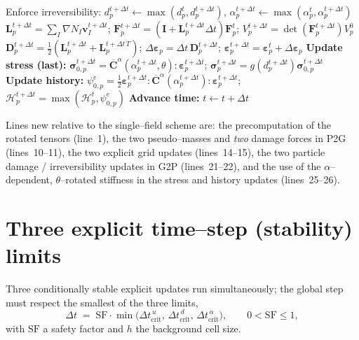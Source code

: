 \documentclass[12pt,a4paper]{article}
\newcommand{\bF}{\mathbf{F}}
\newcommand{\bI}{\mathbf{I}}
\newcommand{\bsig}{\boldsymbol{\sigma}}
\newcommand{\beps}{\boldsymbol{\varepsilon}}
\newcommand{\bv}{\mathbf{v}}
\newcommand{\bL}{\mathbf{L}}
\newcommand{\bD}{\mathbf{D}}
\newcommand{\Ca}{\overline{\mathbf{C}}^{\alpha}}     %
\newcommand{\Dt}{\Delta t}
\begin{document}
\begin{algorithm}[H]
\begin{algorithmic}[1]
					\State Enforce irreversibility: $d_p^{t+\Dt}\!\leftarrow\!\max(d_p^t,d_p^{t+\Dt})$,\;\; $\alpha_p^{t+\Dt}\!\leftarrow\!\max(\alpha_p^t,\alpha_p^{t+\Dt})$
					\State $\bL_p^{t+\Dt}=\sum_I\nabla N_I\bv_I^{t+\Dt}$;\;\;
					$\bF_p^{t+\Dt}=(\bI+\bL_p^{t+\Dt}\Dt)\bF_p^{t}$;\;\; $V_p^{t+\Dt}=\det(\bF_p^{t+\Dt})V_p^0$
					\State $\bD_p^{t+\Dt}=\tfrac12(\bL_p^{t+\Dt}+\bL_p^{t+\Dt\,T})$;\;\; $\Delta\beps_p=\Dt\,\bD_p^{t+\Dt}$;\;\; $\beps_p^{t+\Dt}=\beps_p^{t}+\Delta\beps_p$
					\State \textbf{Update stress (last):} $\bsig_{0,p}^{t+\Dt}=\Ca(\alpha_p^{t+\Dt},\theta)\!:\!\beps_p^{t+\Dt}$;\;\; $\bsig_p^{t+\Dt}=g(d_p^{t+\Dt})\bsig_{0,p}^{t+\Dt}$
					\State \textbf{Update history:} $\psi^e_{0,p}=\tfrac12\beps_p^{t+\Dt}\!:\!\Ca(\alpha_p^{t+\Dt})\!:\!\beps_p^{t+\Dt}$;\;\; $\mathcal{H}_p^{t+\Dt}=\max(\mathcal{H}_p^t,\psi^e_{0,p})$
				\EndPhase
				\State \textbf{Advance time:} $t\leftarrow t+\Dt$
			\EndWhile
		\end{algorithmic}
	\end{algorithm}

	Lines new relative to the single--field scheme are: the precomputation of the
	rotated tensors (line~1), the two pseudo--masses and \emph{two} damage forces in
	P2G (lines~10--11), the two explicit grid updates (lines~14--15), the two
	particle damage / irreversibility updates in G2P (lines~21--22), and the use of
	the $\alpha$--dependent, $\theta$--rotated stiffness in the stress and history
	updates (lines~25--26).

	\section{Three explicit time--step (stability) limits}\label{sec:cfl}

	Three conditionally stable explicit updates run simultaneously; the global step
	must respect the smallest of the three limits,
	\begin{equation}\label{eq:dtmin}
		\Dt \;=\; \mathrm{SF}\cdot\min\bigl(\Dt^{\,u}_{\mathrm{crit}},\,\Dt^{\,d}_{\mathrm{crit}},\,\Dt^{\,\alpha}_{\mathrm{crit}}\bigr),
		\qquad 0<\mathrm{SF}\le1,
	\end{equation}
	with $\mathrm{SF}$ a safety factor and $h$ the background cell size.
\end{document}

